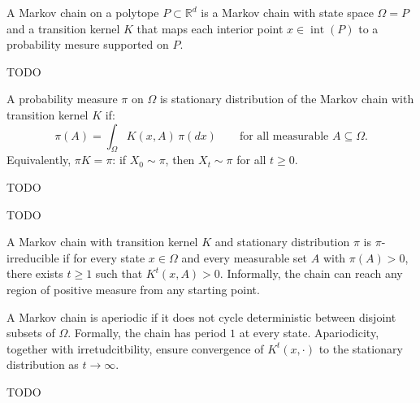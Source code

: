 \begin{definition}
A Markov chain on a polytope $P\subset \mathbb{R}^d$ is a Markov chain with state space $\Omega = P$ and a transition kernel $K$ that maps each interior point $x \in \operatorname{int}(P)$ to a probability mesure supported on $P$.
\end{definition}

\begin{definition}
TODO
\end{definition}

\begin{definition}
A probability measure $\pi$ on $\Omega$ is stationary distribution of the Markov chain with transition kernel $K$ if:
\[
\pi(A) = \int_\Omega K(x, A)\, \pi(dx) \qquad \text{for all measurable } A \subseteq \Omega.
\]
Equivalently, $\pi K = \pi$: if $X_0 \sim \pi$, then $X_t \sim \pi$ for all $t \geq 0$.
\end{definition}

\begin{definition}
TODO
\end{definition}

\begin{proposition}
TODO
\end{proposition}

\begin{definition}[Irreducibility]
A Markov chain with transition kernel $K$ and stationary distribution $\pi$ is $\pi$-irreducible if for every state $x \in \Omega$ and every measurable set $A$ with $\pi(A) > 0$, there exists $t\geq 1$ such that $K^t(x,A) > 0$. Informally, the chain can reach any region of positive measure from any starting point.
\end{definition}

\begin{definition}[Aperiodicity]
A Markov chain is aperiodic if it does not cycle deterministic between disjoint subsets of $\Omega$. Formally, the chain has period $1$ at every state. Apariodicity, together with irretudcitbility, ensure convergence
of $K^t(x,\cdot)$ to the stationary distribution as $t \to \infty$.
\end{definition}

\begin{theorem}
TODO
\end{theorem}


